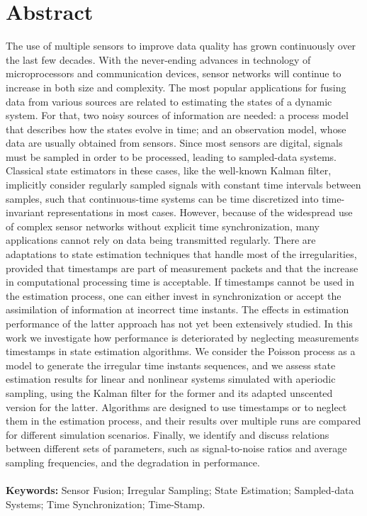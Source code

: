 \chapter*{Abstract}

\vspace{-2cm} 
The use of multiple sensors to improve data quality has grown continuously over the last few decades. With the never-ending advances in technology of microprocessors and communication devices, sensor networks will continue to increase in both size and complexity. The most popular applications for fusing data from various sources are related to estimating the states of a dynamic system. For that, two noisy sources of information are needed: a process model that describes how the states evolve in time; and an observation model, whose data are usually obtained from sensors. Since most sensors are digital, signals must be sampled in order to be processed, leading to sampled-data systems. Classical state estimators in these cases, like the well-known Kalman filter, implicitly consider regularly sampled signals with constant time intervals between samples, such that continuous-time systems can be time discretized into time-invariant representations in most cases. However, because of the widespread use of complex sensor networks without explicit time synchronization, many applications cannot rely on data being transmitted regularly. There are adaptations to state estimation techniques that handle most of the irregularities, provided that timestamps are part of measurement packets and that the increase in computational processing time is acceptable. If timestamps cannot be used in the estimation process, one can either invest in synchronization or accept the assimilation of information at incorrect time instants. The effects in estimation performance of the latter approach has not yet been extensively studied. In this work we investigate how performance is deteriorated by neglecting measurements timestamps in state estimation algorithms. We consider the Poisson process as a model to generate the irregular time instants sequences, and we assess state estimation results for linear and nonlinear systems simulated with aperiodic sampling, using the Kalman filter for the former and its adapted unscented version for the latter. Algorithms are designed to use timestamps or to neglect them in the estimation process, and their results over multiple runs are compared for different simulation scenarios. Finally, we identify and discuss relations between different sets of parameters, such as signal-to-noise ratios and average sampling frequencies, and the degradation in performance.
\\ \\
\textbf{Keywords:} Sensor Fusion; Irregular Sampling; State Estimation; Sampled-data Systems; Time Synchronization; Time-Stamp.
